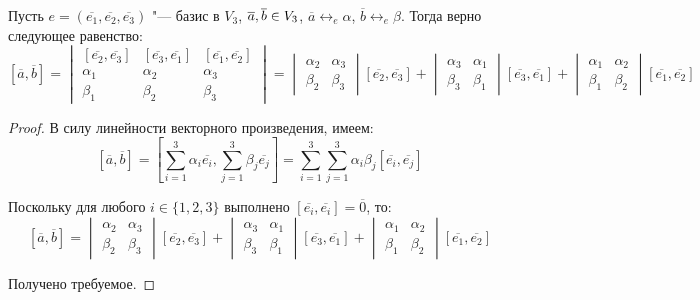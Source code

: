     \begin{theorem}
    	Пусть $e = (\overline{e_1}, \overline{e_2}, \overline{e_3})$ "--- базис в $V_3$, $\overline{a}, \overline{b} \hm{\in} V_3$, $\overline{a} \leftrightarrow_{e} \alpha$, $\overline{b} \leftrightarrow_{e} \beta$. Тогда верно следующее равенство:
    	\[[\overline{a}, \overline{b}] =
    	\begin{vmatrix}
    	[\overline{e_2}, \overline{e_3}] & [\overline{e_3}, \overline{e_1}] & [\overline{e_1}, \overline{e_2}]\\
    	\alpha_1 & \alpha_2 & \alpha_3\\
    	\beta_1 & \beta_2 & \beta_3
    	\end{vmatrix} = \begin{vmatrix}
    	\alpha_2 & \alpha_3\\
    	\beta_2 & \beta_3
    	\end{vmatrix}[\overline{e_2}, \overline{e_3}] + 
    	\begin{vmatrix}
    	\alpha_3 & \alpha_1\\
    	\beta_3 & \beta_1
    	\end{vmatrix}[\overline{e_3}, \overline{e_1}] +
    	\begin{vmatrix}
    	\alpha_1 & \alpha_2\\
    	\beta_1 & \beta_2
    	\end{vmatrix}[\overline{e_1}, \overline{e_2}]
    	\]
    \end{theorem}
    
    \begin{proof}
    	В силу линейности векторного произведения, имеем:	
    	\[[\overline{a}, \overline{b}] =\left[\sum_{i = 1}^{3}\alpha_i\overline{e_i}, \sum_{j = 1}^{3}\beta_j\overline{e_j}\right] = \sum_{i = 1}^{3}\sum_{j = 1}^{3}\alpha_i\beta_j[\overline{e_i}, \overline{e_j}]\]
    	
    	Поскольку для любого $i \in \{1, 2, 3\}$ выполнено $[\overline{e_i}, \overline{e_i}] = \overline{0}$, то:
    	\[[\overline{a}, \overline{b}]=
    	\begin{vmatrix}
    	\alpha_2 & \alpha_3\\
    	\beta_2 & \beta_3
    	\end{vmatrix}[\overline{e_2}, \overline{e_3}] + 
    	\begin{vmatrix}
    	\alpha_3 & \alpha_1\\
    	\beta_3 & \beta_1
    	\end{vmatrix}[\overline{e_3}, \overline{e_1}] +
    	\begin{vmatrix}
    	\alpha_1 & \alpha_2\\
    	\beta_1 & \beta_2
    	\end{vmatrix}[\overline{e_1}, \overline{e_2}]\]
    
    	Получено требуемое.
    \end{proof}
    
